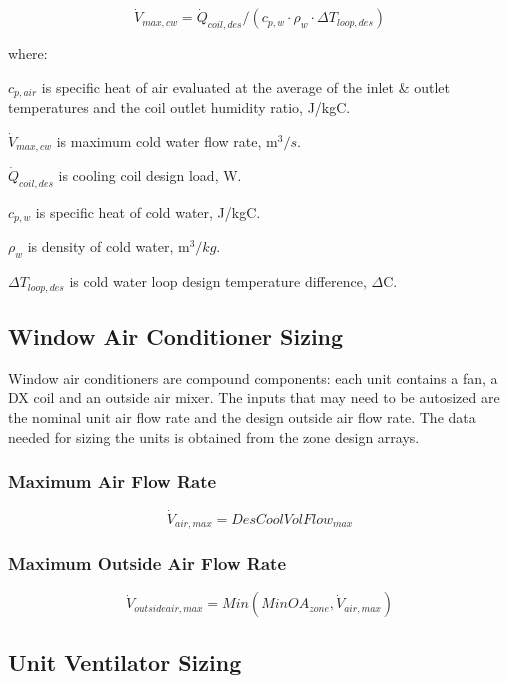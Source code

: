 \begin{equation}
\dot{V}_{max,cw} = \dot{Q}_{coil,des} / (c_{p,w} \cdot \rho_w \cdot \Delta T_{loop,des})
\end{equation}

where:

\(c_{p,air}\) is specific heat of air evaluated at the average of the inlet \& outlet temperatures and the coil outlet humidity ratio, J/kgC.

\(\dot{V}_{max,cw}\) is maximum cold water flow rate, m$^{3}/s$.

\(\dot{Q}_{coil,des}\) is cooling coil design load, W.

\(c_{p,w}\) is specific heat of cold water, J/kgC.

\(\rho_{w}\) is density of cold water, m$^{3}/kg$.

\(\Delta T_{loop,des}\) is cold water loop design temperature difference, \(\Delta\)C.

\subsection{Window Air Conditioner Sizing}\label{window-air-conditioner-sizing}

Window air conditioners are compound components: each unit contains a fan, a DX coil and an outside air mixer. The inputs that may need to be autosized are the nominal unit air flow rate and the design outside air flow rate. The data needed for sizing the units is obtained from the zone design arrays.

\subsubsection{Maximum Air Flow Rate}\label{maximum-air-flow-rate-1}

\begin{equation}
{\dot V_{air,max}} = DesCoolVolFlo{w_{max}}
\end{equation}

\subsubsection{Maximum Outside Air Flow Rate}\label{maximum-outside-air-flow-rate-1}

\begin{equation}
\dot V_{outsideair,max} = Min(MinOA_{zone},\dot V_{air,max})
\end{equation}

\subsection{Unit Ventilator Sizing}\label{unit-ventilator-sizing}

